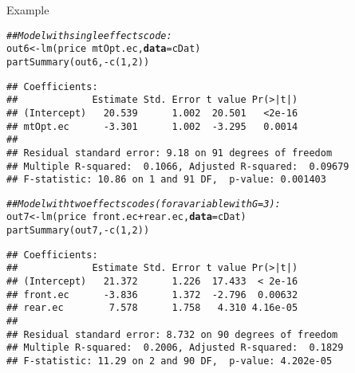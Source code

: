 \documentclass{beamer}\usepackage[]{graphicx}\usepackage[]{color}
\makeatletter
\newcommand{\hlnum}[1]{\textcolor[rgb]{0.69,0.494,0}{#1}}%
\newcommand{\hlcom}[1]{\textcolor[rgb]{0.514,0.506,0.514}{\textit{#1}}}%
\newcommand{\hlopt}[1]{\textcolor[rgb]{0,0,0}{#1}}%
\newcommand{\hlstd}[1]{\textcolor[rgb]{0,0,0}{#1}}%
\newcommand{\hlkwb}[1]{\textcolor[rgb]{0,0.341,0.682}{#1}}%
\newcommand{\hlkwc}[1]{\textcolor[rgb]{0,0,0}{\textbf{#1}}}%
\newcommand{\hlkwd}[1]{\textcolor[rgb]{0.004,0.004,0.506}{#1}}%
\newenvironment{kframe}{%
 \def\at@end@of@kframe{}%
 \ifinner\ifhmode%
  \def\at@end@of@kframe{\end{minipage}}%
  \begin{minipage}{\columnwidth}%
 \fi\fi%
 \def\FrameCommand##1{\hskip\@totalleftmargin \hskip-\fboxsep
 \colorbox{shadecolor}{##1}\hskip-\fboxsep
     \hskip-\linewidth \hskip-\@totalleftmargin \hskip\columnwidth}%
 \MakeFramed {\advance\hsize-\width
   \@totalleftmargin\z@ \linewidth\hsize
   \@setminipage}}%
 {\par\unskip\endMakeFramed%
 \at@end@of@kframe}
\newenvironment{knitrout}{}{} %
\makeatother
\begin{document}
\begin{frame}{Example}
  
\begin{knitrout}\footnotesize
{}\color{fgcolor}\begin{kframe}
\begin{alltt}
\hlcom{## Model with single effects code:}
\hlstd{out6} \hlkwb{<-} \hlkwd{lm}\hlstd{(price} \hlopt{~} \hlstd{mtOpt.ec,} \hlkwc{data} \hlstd{= cDat)}
\hlkwd{partSummary}\hlstd{(out6,} \hlopt{-}\hlkwd{c}\hlstd{(}\hlnum{1}\hlstd{,} \hlnum{2}\hlstd{))}
\end{alltt}
\begin{verbatim}
## Coefficients:
##             Estimate Std. Error t value Pr(>|t|)
## (Intercept)   20.539      1.002  20.501   <2e-16
## mtOpt.ec      -3.301      1.002  -3.295   0.0014
## 
## Residual standard error: 9.18 on 91 degrees of freedom
## Multiple R-squared:  0.1066,	Adjusted R-squared:  0.09679 
## F-statistic: 10.86 on 1 and 91 DF,  p-value: 0.001403
\end{verbatim}
\end{kframe}
\end{knitrout}

\pagebreak

\begin{knitrout}\footnotesize
{}\color{fgcolor}\begin{kframe}
\begin{alltt}
\hlcom{## Model with two effects codes (for a variable with G = 3):}
\hlstd{out7} \hlkwb{<-} \hlkwd{lm}\hlstd{(price} \hlopt{~} \hlstd{front.ec} \hlopt{+} \hlstd{rear.ec,} \hlkwc{data} \hlstd{= cDat)}
\hlkwd{partSummary}\hlstd{(out7,} \hlopt{-}\hlkwd{c}\hlstd{(}\hlnum{1}\hlstd{,} \hlnum{2}\hlstd{))}
\end{alltt}
\begin{verbatim}
## Coefficients:
##             Estimate Std. Error t value Pr(>|t|)
## (Intercept)   21.372      1.226  17.433  < 2e-16
## front.ec      -3.836      1.372  -2.796  0.00632
## rear.ec        7.578      1.758   4.310 4.16e-05
## 
## Residual standard error: 8.732 on 90 degrees of freedom
## Multiple R-squared:  0.2006,	Adjusted R-squared:  0.1829 
## F-statistic: 11.29 on 2 and 90 DF,  p-value: 4.202e-05
\end{verbatim}
\end{kframe}
\end{knitrout}

\end{frame}
\end{document}
